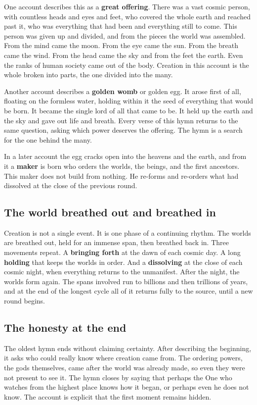 One account describes this as a \textbf{great offering}. There was a vast cosmic person, with countless heads and eyes and feet, who covered the whole earth and reached past it, who was everything that had been and everything still to come. This person was given up and divided, and from the pieces the world was assembled. From the mind came the moon. From the eye came the sun. From the breath came the wind. From the head came the sky and from the feet the earth. Even the ranks of human society came out of the body. Creation in this account is the whole broken into parts, the one divided into the many.

Another account describes a \textbf{golden womb} or golden egg. It arose first of all, floating on the formless water, holding within it the seed of everything that would be born. It became the single lord of all that came to be. It held up the earth and the sky and gave out life and breath. Every verse of this hymn returns to the same question, asking which power deserves the offering. The hymn is a search for the one behind the many.

In a later account the egg cracks open into the heavens and the earth, and from it a \textbf{maker} is born who orders the worlds, the beings, and the first ancestors. This maker does not build from nothing. He re-forms and re-orders what had dissolved at the close of the previous round.

\subsection{The world breathed out and breathed in}

Creation is not a single event. It is one phase of a continuing rhythm. The worlds are breathed out, held for an immense span, then breathed back in. Three movements repeat. A \textbf{bringing forth} at the dawn of each cosmic day. A long \textbf{holding} that keeps the worlds in order. And a \textbf{dissolving} at the close of each cosmic night, when everything returns to the unmanifest. After the night, the worlds form again. The spans involved run to billions and then trillions of years, and at the end of the longest cycle all of it returns fully to the source, until a new round begins.

\subsection{The honesty at the end}

The oldest hymn ends without claiming certainty. After describing the beginning, it asks who could really know where creation came from. The ordering powers, the gods themselves, came after the world was already made, so even they were not present to see it. The hymn closes by saying that perhaps the One who watches from the highest place knows how it began, or perhaps even he does not know. The account is explicit that the first moment remains hidden.
